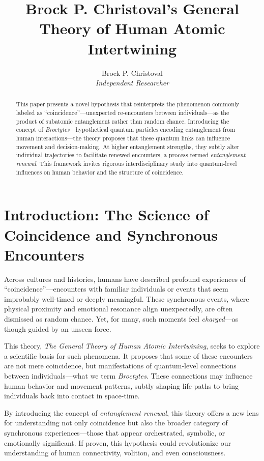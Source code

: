 \documentclass[11pt]{article}
\title{\textbf{Brock P. Christoval's General Theory of Human Atomic Intertwining}}
\author{Brock P. Christoval \\ \textit{Independent Researcher}}
\date{}
\begin{document}
\maketitle

\begin{abstract}
This paper presents a novel hypothesis that reinterprets the phenomenon commonly labeled as ``coincidence''—unexpected re-encounters between individuals—as the product of subatomic entanglement rather than random chance. Introducing the concept of \textit{Broctytes}—hypothetical quantum particles encoding entanglement from human interactions—the theory proposes that these quantum links can influence movement and decision-making. At higher entanglement strengths, they subtly alter individual trajectories to facilitate renewed encounters, a process termed \textit{entanglement renewal}. This framework invites rigorous interdisciplinary study into quantum-level influences on human behavior and the structure of coincidence.
\end{abstract}

\section{Introduction: The Science of Coincidence and Synchronous Encounters}

Across cultures and histories, humans have described profound experiences of ``coincidence''—encounters with familiar individuals or events that seem improbably well-timed or deeply meaningful. These synchronous events, where physical proximity and emotional resonance align unexpectedly, are often dismissed as random chance. Yet, for many, such moments feel \textit{charged}—as though guided by an unseen force.

This theory, \textit{The General Theory of Human Atomic Intertwining}, seeks to explore a scientific basis for such phenomena. It proposes that some of these encounters are not mere coincidence, but manifestations of quantum-level connections between individuals—what we term \textit{Broctytes}. These connections may influence human behavior and movement patterns, subtly shaping life paths to bring individuals back into contact in space-time.

By introducing the concept of \textit{entanglement renewal}, this theory offers a new lens for understanding not only coincidence but also the broader category of synchronous experiences—those that appear orchestrated, symbolic, or emotionally significant. If proven, this hypothesis could revolutionize our understanding of human connectivity, volition, and even consciousness.
\end{document}
